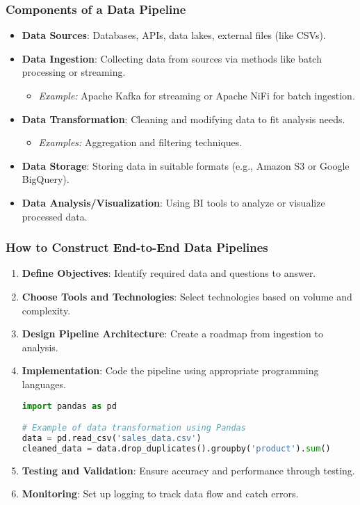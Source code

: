\documentclass{beamer}
\begin{document}
\begin{frame}[fragile]
    \frametitle{Components of a Data Pipeline}
    \begin{itemize}
        \item \textbf{Data Sources}: Databases, APIs, data lakes, external files (like CSVs).
        \item \textbf{Data Ingestion}: Collecting data from sources via methods like batch processing or streaming.
        \begin{itemize}
            \item \textit{Example:} Apache Kafka for streaming or Apache NiFi for batch ingestion.
        \end{itemize}
        \item \textbf{Data Transformation}: Cleaning and modifying data to fit analysis needs.
        \begin{itemize}
            \item \textit{Examples:} Aggregation and filtering techniques.
        \end{itemize}
        \item \textbf{Data Storage}: Storing data in suitable formats (e.g., Amazon S3 or Google BigQuery).
        \item \textbf{Data Analysis/Visualization}: Using BI tools to analyze or visualize processed data.
    \end{itemize}
\end{frame}

\begin{frame}[fragile]
    \frametitle{How to Construct End-to-End Data Pipelines}
    \begin{enumerate}
        \item \textbf{Define Objectives}: Identify required data and questions to answer.
        \item \textbf{Choose Tools and Technologies}: Select technologies based on volume and complexity.
        \item \textbf{Design Pipeline Architecture}: Create a roadmap from ingestion to analysis.
        \item \textbf{Implementation}: Code the pipeline using appropriate programming languages.
        \begin{lstlisting}[language=Python]
import pandas as pd

# Example of data transformation using Pandas
data = pd.read_csv('sales_data.csv')
cleaned_data = data.drop_duplicates().groupby('product').sum()
        \end{lstlisting}
        \item \textbf{Testing and Validation}: Ensure accuracy and performance through testing.
        \item \textbf{Monitoring}: Set up logging to track data flow and catch errors.
    \end{enumerate}
\end{frame}
\end{document}
